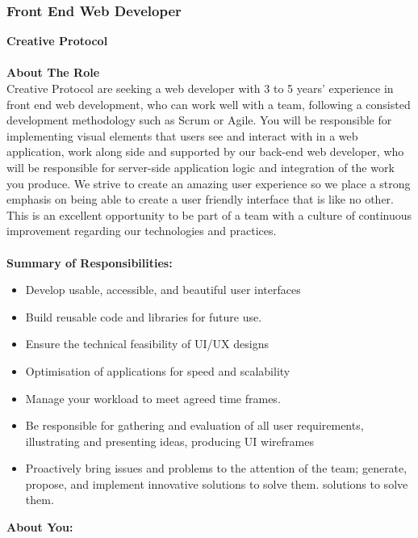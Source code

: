 \documentclass[11pt, oneside, a4paper, titlepage]{article}
\begin{document}
\subsubsection{Front End Web Developer}
\textbf{Creative Protocol }
\\
\\
\textbf{About The Role}
\\
Creative Protocol are seeking a web developer with 3 to 5 years' experience in front end web development, who can work well with a team, following a consisted development methodology such as Scrum or Agile. You will be  responsible for implementing visual elements that users see and interact with in a web application, work along side and supported by our back-end web developer, who will be responsible for server-side application logic and integration of the work you produce. We strive to create an amazing user experience so we place a strong emphasis on being able to create a user friendly interface that is like no other. This is an excellent opportunity to be part of a team with a culture of continuous improvement regarding our technologies and practices. 
\\
\\
\textbf{Summary of Responsibilities:}
\begin{itemize}
    	\item Develop usable, accessible, and beautiful user interfaces 
    	\item Build reusable code and libraries for future use. 
    	\item Ensure the technical feasibility of UI/UX designs 
    	\item Optimisation of applications for speed and scalability 
    	\item Manage your workload to meet agreed time frames. 
    	\item Be responsible for gathering and evaluation of all user requirements, illustrating and presenting ideas, producing UI wireframes 
    	\item Proactively bring issues and problems to the attention of the team; generate, propose, and implement innovative solutions to solve them.  solutions to solve them. 
\end{itemize}
\hfill \break
\textbf{About You:}
\end{document}
